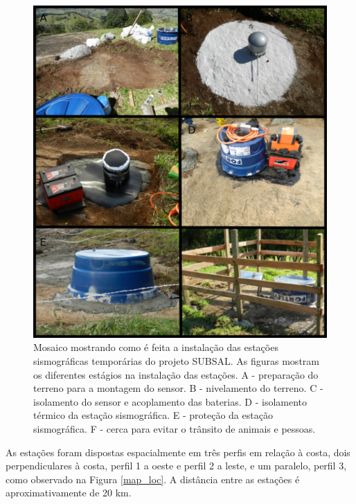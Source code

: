 \begin{figure}[!ht]
\centering
\includegraphics[scale=0.45]{Figs/instalacao.png}
\caption[Mosaico mostrando como é feita a instalação das estações sismográficas temporárias do projeto SUBSAL.]{Mosaico mostrando como é feita a instalação das estações sismográficas temporárias do projeto SUBSAL. As figuras mostram os diferentes estágios na instalação das estações. A - preparação do terreno para a montagem do sensor. B - nivelamento do terreno. C - isolamento do sensor e acoplamento das baterias. D - isolamento térmico da estação sismográfica.  E - proteção da estação sismográfica. F - cerca para evitar o trânsito de animais e pessoas.}
\label{instalacao}
\end{figure} 

As estações foram dispostas espacialmente em três perfis em relação à costa, dois perpendiculares à costa, perfil 1 a oeste e perfil 2 a leste, e um paralelo, perfil 3, como observado na Figura \ref{map_loc}. A distância entre as estações é aproximativamente de 20 km.

